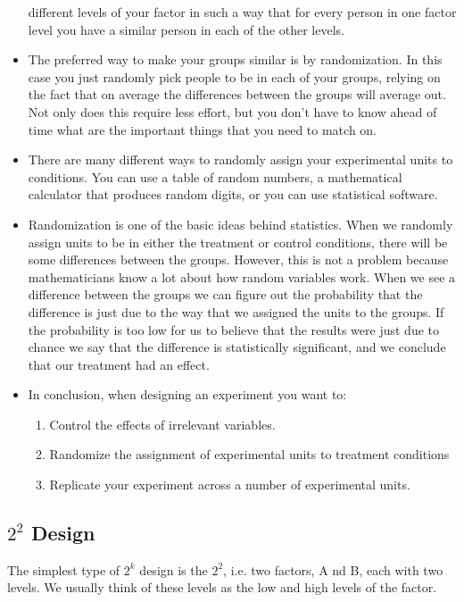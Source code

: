 \begin{itemize}
	different levels of your factor in such a way that for every person in one factor level you have a similar
	person in each of the other levels.
	\item The preferred way to make your groups similar is by randomization. In this case you just randomly
	pick people to be in each of your groups, relying on the fact that on average the differences between
	the groups will average out. Not only does this require less effort, but you don't have to know ahead
	of time what are the important things that you need to match on.
	\item There are many different ways to randomly assign your experimental units to conditions. You can use
	a table of random numbers, a mathematical calculator that produces random digits, or you can use
	statistical software.
	\item Randomization is one of the basic ideas behind statistics. When we randomly assign units to be in
	either the treatment or control conditions, there will be some differences between the groups. However,
	this is not a problem because mathematicians know a lot about how random variables work. When we
	see a difference between the groups we can figure out the probability that the difference is just due to
	the way that we assigned the units to the groups. If the probability is too low for us to believe that the
	results were just due to chance we say that the difference is statistically significant, and we conclude
	that our treatment had an effect.
	\item In conclusion, when designing an experiment you want to:
	\begin{enumerate}
		\item Control the effects of irrelevant variables.
		\item Randomize the assignment of experimental units to treatment conditions
		\item Replicate your experiment across a number of experimental units.
	\end{enumerate}
\end{itemize}




\subsection{ $2^2$ Design}

The simplest type of $2^k$ design is the $2^2$, i.e. two factors, A nd B, each with two levels. We usually think of these levels as the low and high levels of the factor.



